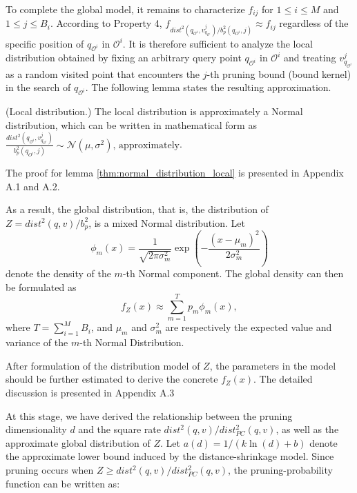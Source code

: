 To complete the global model, it remains to characterize $f_{ij}$ for $1\leq i\leq M$ and $1\leq j \leq B_i$. According to Property 4, $f_{dist^2(q_{\mathcal{O}^i},v^{j}_{q_{\mathcal{O}^i}})/b^{2}_{p}(q_{O^i},j)} \approx f_{ij}$ regardless of the specific position of $q_{\mathcal{O}^i}$ in $\mathcal{O}^i$. It is therefore sufficient to analyze the local distribution obtained by fixing an arbitrary query point $q_{\mathcal{O}^i}$ in $\mathcal{O}^i$ and treating $v^{j}_{q_{\mathcal{O}^i}}$ as a random visited point that encounters the $j$-th pruning bound (bound kernel) in the search of $q_{\mathcal{O}^i}$. The following lemma states the resulting approximation.


\begin{lemma}{(Local distribution.)}
The local distribution is approximately a Normal distribution, which can be written in mathematical form as $\frac{dist^2(q_{\mathcal{O}^i},v^{j}_{q_{\mathcal{O}^i}})}{b^2_{p}(q_{O^i},j)} \sim \mathcal{N}(\mu, \sigma^2), \, \text{approximately}$. 

\label{thm:normal_distribution_local}
\end{lemma}
The proof for lemma \ref{thm:normal_distribution_local} is presented in Appendix A.1 and A.2.

As a result, the global distribution, that is, the distribution of $Z=dist^2(q,v)/b_{p}^2$, is a mixed Normal distribution. Let
\[
\phi_m(x)=\frac{1}{\sqrt{2\pi\sigma^2_m}}\exp\left(-\frac{(x-\mu_m)^2}{2\sigma^2_m}\right)
\]
denote the density of the $m$-th Normal component. The global density can then be formulated as
\begin{equation}
f_Z(x)\approx \sum^{T}_{m=1}p_m\phi_m(x),
\end{equation}
 where $T=\sum^{M}_{i=1}B_i$, and $\mu_m$ and $\sigma^2_{m}$ are respectively the expected value and variance of the $m$-th Normal Distribution.

After formulation of the distribution model of $Z$, the parameters in the model should be further estimated to derive the concrete $f_Z(x)$. The detailed discussion is presented in Appendix A.3


At this stage, we have derived the relationship between the pruning dimensionality $d$ and the square rate $dist^2(q,v)/dist^2_{PC}(q,v)$, as well as the approximate global distribution of $Z$. Let $a(d)=1/(k\ln(d)+b)$ denote the approximate lower bound induced by the distance-shrinkage model. Since pruning occurs when $Z\geq dist^2(q,v)/dist^2_{PC}(q,v)$, the pruning-probability function can be written as:







